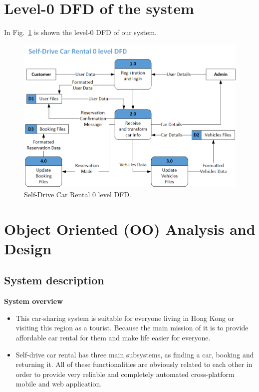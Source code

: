 \documentclass{article}
\begin{document}
    
\section{Level-0 DFD of the system}
In Fig.~\ref{fig:Level0DFD} is shown the level-0 DFD of our system.
    \begin{figure}[h]
        \centering
        \includegraphics[width=\textwidth]{img/Level0DFD.png}
        \caption{Self-Drive Car Rental 0 level DFD.}
        \label{fig:Level0DFD}
    \end{figure}

\section{Object Oriented (OO) Analysis and Design}
    \subsection{System description}
    
    \textbf{System overview}
    \begin{itemize}
        \item This car-sharing system is suitable for everyone living in Hong Kong or visiting this region as a tourist. Because the main mission of it is to provide affordable car rental for them and make life easier for everyone.
        \item Self-drive car rental has three main subsystems, as finding a car, booking and returning it. All of these functionalities are obviously related to each other in order to provide very reliable and completely automated cross-platform mobile and web application.
    \end{itemize}
    
\end{document}
